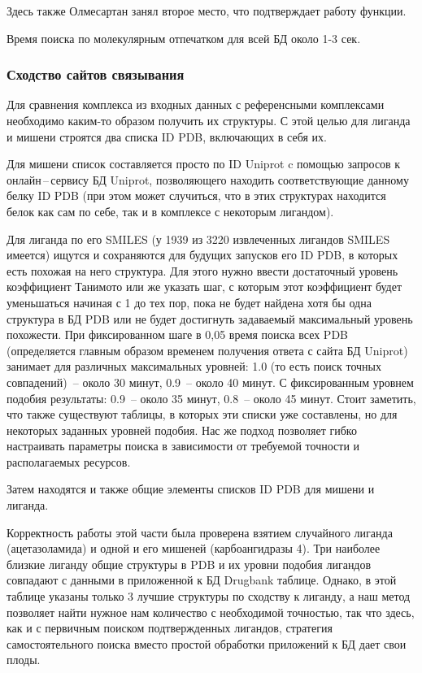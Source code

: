 \documentclass[a4paper,14pt]{article}         %
\begin{document}
Здесь также Олмесартан занял второе место, что подтверждает работу функции.

Время поиска по молекулярным отпечатком для всей БД около 1-3 сек.
\subsubsection{Сходство сайтов связывания}
Для сравнения комплекса из входных данных с референсными комплексами необходимо каким-то образом получить их структуры. С этой целью для лиганда и мишени строятся два списка ID PDB, включающих в себя их. 

Для мишени список составляется просто по ID Uniprot c помощью запросов к онлайн\,--\,сервису БД Uniprot, позволяющего находить соответствующие данному белку ID PDB (при этом может случиться, что в этих структурах находится белок как сам по себе, так и в комплексе с некоторым лигандом). 

Для лиганда по его SMILES (у 1939 из 3220 извлеченных лигандов SMILES имеется) ищутся и сохраняются для будущих запусков его ID PDB, в которых есть похожая на него структура. Для этого нужно ввести достаточный уровень коэффициент Танимото или же указать шаг, с которым этот коэффициент будет уменьшаться начиная с 1 до тех пор, пока не будет найдена хотя бы одна структура в БД PDB или не будет достигнуть задаваемый максимальный уровень похожести. При фиксированном шаге в 0,05 время поиска всех PDB (определяется главным образом временем получения ответа с сайта БД Uniprot) занимает для различных максимальных уровней: 1.0 (то есть поиск точных совпадений)~-- около 30 минут, 0.9~-- около 40 минут. С фиксированным уровнем подобия результаты: 0.9~-- около 35 минут, 0.8~-- около 45 минут. Стоит заметить, что также существуют таблицы, в которых эти списки уже составлены, но для некоторых заданных уровней подобия. Нас же подход позволяет гибко настраивать параметры поиска в зависимости от требуемой точности и располагаемых ресурсов.

Затем находятся и также общие элементы списков ID PDB для мишени и лиганда.

Корректность работы этой части была проверена взятием случайного лиганда (ацетазоламида) и одной и его мишеней (карбоангидразы 4). Три наиболее близкие лиганду общие структуры в PDB и их уровни подобия лигандов совпадают с данными в приложенной к БД Drugbank таблице. Однако, в этой таблице указаны только 3 лучшие структуры по сходству к лиганду, а наш метод позволяет найти нужное нам количество с необходимой точностью, так что здесь, как и с первичным поиском подтвержденных лигандов, стратегия самостоятельного поиска вместо простой обработки приложений к БД дает свои плоды.
\end{document}
